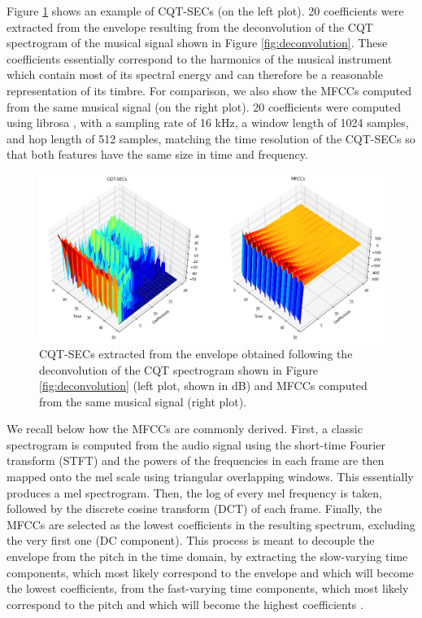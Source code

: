 \documentclass[journal]{IEEEtran}
\begin{document}
Figure \ref{fig:extraction} shows an example of CQT-SECs (on the left plot). 20 coefficients were extracted from the envelope resulting from the deconvolution of the CQT spectrogram of the musical signal shown in Figure \ref{fig:deconvolution}. These coefficients essentially correspond to the harmonics of the musical instrument which contain most of its spectral energy and can therefore be a reasonable representation of its timbre. For comparison, we also show the MFCCs computed from the same musical signal (on the right plot). 20 coefficients were computed using librosa \cite{mcfee2015}, with a sampling rate of 16 kHz, a window length of 1024 samples, and hop length of 512 samples, matching the time resolution of the CQT-SECs so that both features have the same size in time and frequency. 

\begin{figure}[htp]
    \centering
    \includegraphics[width=\textwidth]{extraction.png}
    \caption{CQT-SECs extracted from the envelope obtained following the deconvolution of the CQT spectrogram shown in Figure \ref{fig:deconvolution} (left plot, shown in dB) and MFCCs computed from the same musical signal (right plot).}
    \label{fig:extraction}
\end{figure}

We recall below how the MFCCs are commonly derived. First, a classic spectrogram is computed from the audio signal using the short-time Fourier transform (STFT) and the powers of the frequencies in each frame are then mapped onto the mel scale \cite{stevens1937} using triangular overlapping windows. This essentially produces a mel spectrogram. Then, the log of every mel frequency is taken, followed by the discrete cosine transform (DCT) of each frame. Finally, the MFCCs are selected as the lowest coefficients in the resulting spectrum, excluding the very first one (DC component). This process is meant to decouple the envelope from the pitch in the time domain, by extracting the slow-varying time components, which most likely correspond to the envelope and which will become the lowest coefficients, from the fast-varying time components, which most likely correspond to the pitch and which will become the highest coefficients \cite{mermelstein1976}. 
\end{document}
